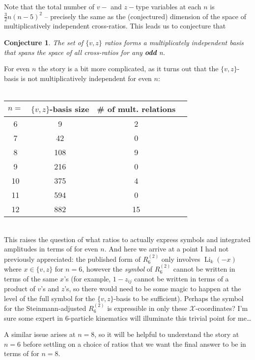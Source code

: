 \documentclass[12pt]{article}
\DeclareMathOperator{\Li}{Li}
\newtheorem{conjecture}{Conjecture}
\begin{document}
Note that the total number of $v-$ and $z-$type variables at each $n$ is $\frac{3}{2}n(n-5)^2$ -- precisely the same as the (conjectured) dimension of the space of multiplicatively independent cross-ratios. This leads us to conjecture that 
\begin{conjecture}
The set of $\{v,z\}$ ratios forms a multiplicately independent basis that spans the space of all cross-ratios for any \textbf{odd} n.
\end{conjecture}
For even $n$ the story is a bit more complicated, as it turns out that the $\{v,z\}$-basis is not multiplicatively independent for even $n$:\\
\pagebreak\\
\begin{table}[h!]
\begin{center}
    \begin{tabular}{ c|c|c|c|}
        \cline{1-3}
    \multicolumn{1}{|c|}{$n=$} & $\{v,z\}$-basis size & \# of mult. relations  \\ \hline
    \multicolumn{1}{|c|}{6}& 9 & 2   \\ \hline 
    \multicolumn{1}{|c|}{7}& 42 & 0 \\ \hline
    \multicolumn{1}{|c|}{8}& 108 & 9   \\ \hline
    \multicolumn{1}{|c|}{9}& 216 & 0  \\ \hline
    \multicolumn{1}{|c|}{10}& 375 & 4  \\ \hline
    \multicolumn{1}{|c|}{11}& 594 & 0  \\ \hline
    \multicolumn{1}{|c|}{12}& 882 & 15  \\ \hline
    \end{tabular}
\end{center}
\end{table}\\
This raises the question of what ratios to actually express symbols and integrated amplitudes in terms of for even $n$. And here we arrive at a point I had not previously appreciated: the published form of $R^{(2)}_6$ only involves $\Li_k(-x)$ where $x\in\{v,z\}$ for $n=6$, however the \emph{symbol} of $R^{(2)}_6$ cannot be written in terms of the same $x$'s (for example, $1-z_{ij}$ cannot be written in terms of a product of $v$'s and $z$'s, so there would need to be some magic to happen at the level of the full symbol for the $\{v,z\}$-basis to be sufficient). Perhaps the symbol for the Steinmann-adjusted $R^{(2)}_6$ is expressible in only these $\mathcal{X}$-coordinates? I'm sure some expert in 6-particle kinematics will illuminate this trivial point for me\ldots

A similar issue arises at $n=8$, so it will be helpful to understand the story at $n=6$ before settling on a choice of ratios that we want the final answer to be in terms of for $n=8$. 
\end{document}
